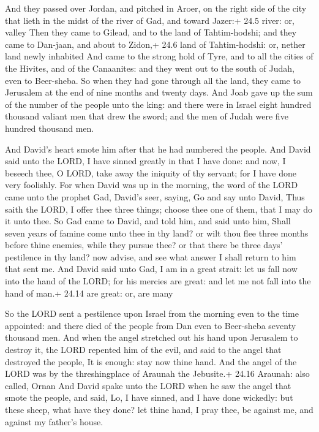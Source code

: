  And they passed over Jordan, and pitched in Aroer, on the
right side of the city that lieth in the midst of the river of Gad, and
toward Jazer:+ 24.5 river: or, valley  Then they came to
Gilead, and to the land of Tahtim-hodshi; and they came to Dan-jaan, and
about to Zidon,+ 24.6 land of Tahtim-hodshi: or, nether land newly
inhabited  And came to the strong hold of Tyre, and to all
the cities of the Hivites, and of the Canaanites: and they went out to
the south of Judah, even to Beer-sheba.  So when they had
gone through all the land, they came to Jerusalem at the end of nine
months and twenty days.  And Joab gave up the sum of the
number of the people unto the king: and there were in Israel eight
hundred thousand valiant men that drew the sword; and the men of Judah
were five hundred thousand men.

 And David's heart smote him after that he had numbered
the people. And David said unto the LORD, I have sinned greatly in that
I have done: and now, I beseech thee, O LORD, take away the iniquity of
thy servant; for I have done very foolishly.  For when
David was up in the morning, the word of the LORD came unto the prophet
Gad, David's seer, saying,  Go and say unto David, Thus
saith the LORD, I offer thee three things; choose thee one of them, that
I may do it unto thee.  So Gad came to David, and told him,
and said unto him, Shall seven years of famine come unto thee in thy
land? or wilt thou flee three months before thine enemies, while they
pursue thee? or that there be three days' pestilence in thy land? now
advise, and see what answer I shall return to him that sent me.
 And David said unto Gad, I am in a great strait: let us
fall now into the hand of the LORD; for his mercies are great: and let
me not fall into the hand of man.+ 24.14 are great: or, are many

 So the LORD sent a pestilence upon Israel from the
morning even to the time appointed: and there died of the people from
Dan even to Beer-sheba seventy thousand men.  And when the
angel stretched out his hand upon Jerusalem to destroy it, the LORD
repented him of the evil, and said to the angel that destroyed the
people, It is enough: stay now thine hand. And the angel of the LORD was
by the threshingplace of Araunah the Jebusite.+ 24.16 Araunah: also
called, Ornan  And David spake unto the LORD when he saw
the angel that smote the people, and said, Lo, I have sinned, and I have
done wickedly: but these sheep, what have they done? let thine hand, I
pray thee, be against me, and against my father's house.

